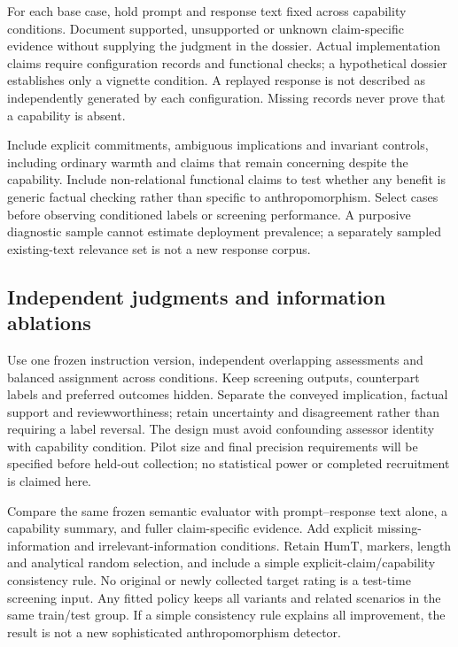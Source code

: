 \documentclass[manuscript,screen,review,anonymous]{acmart}
\begin{document}
For each base case, hold prompt and response text fixed across capability conditions. Document supported, unsupported or unknown claim-specific evidence without supplying the judgment in the dossier. Actual implementation claims require configuration records and functional checks; a hypothetical dossier establishes only a vignette condition. A replayed response is not described as independently generated by each configuration. Missing records never prove that a capability is absent.

Include explicit commitments, ambiguous implications and invariant controls, including ordinary warmth and claims that remain concerning despite the capability. Include non-relational functional claims to test whether any benefit is generic factual checking rather than specific to anthropomorphism. Select cases before observing conditioned labels or screening performance. A purposive diagnostic sample cannot estimate deployment prevalence; a separately sampled existing-text relevance set is not a new response corpus.

\subsection{Independent judgments and information ablations}
Use one frozen instruction version, independent overlapping assessments and balanced assignment across conditions. Keep screening outputs, counterpart labels and preferred outcomes hidden. Separate the conveyed implication, factual support and reviewworthiness; retain uncertainty and disagreement rather than requiring a label reversal. The design must avoid confounding assessor identity with capability condition. Pilot size and final precision requirements will be specified before held-out collection; no statistical power or completed recruitment is claimed here.

Compare the same frozen semantic evaluator with prompt--response text alone, a capability summary, and fuller claim-specific evidence. Add explicit missing-information and irrelevant-information conditions. Retain HumT, markers, length and analytical random selection, and include a simple explicit-claim/capability consistency rule. No original or newly collected target rating is a test-time screening input. Any fitted policy keeps all variants and related scenarios in the same train/test group. If a simple consistency rule explains all improvement, the result is not a new sophisticated anthropomorphism detector.
\end{document}
